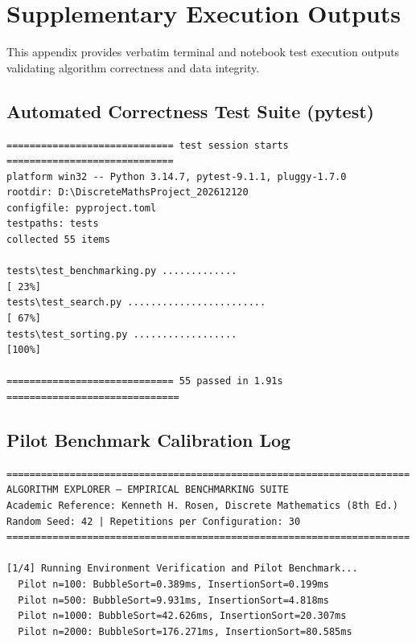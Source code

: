 \chapter{Supplementary Execution Outputs}
\label{app:outputs}

This appendix provides verbatim terminal and notebook test execution outputs validating algorithm correctness and data integrity.

\section{Automated Correctness Test Suite (pytest)}
\begin{verbatim}
============================= test session starts =============================
platform win32 -- Python 3.14.7, pytest-9.1.1, pluggy-1.7.0
rootdir: D:\DiscreteMathsProject_202612120
configfile: pyproject.toml
testpaths: tests
collected 55 items

tests\test_benchmarking.py .............                                 [ 23%]
tests\test_search.py ........................                            [ 67%]
tests\test_sorting.py ..................                                 [100%]

============================= 55 passed in 1.91s ==============================
\end{verbatim}

\section{Pilot Benchmark Calibration Log}
\begin{verbatim}
======================================================================
ALGORITHM EXPLORER — EMPIRICAL BENCHMARKING SUITE
Academic Reference: Kenneth H. Rosen, Discrete Mathematics (8th Ed.)
Random Seed: 42 | Repetitions per Configuration: 30
======================================================================

[1/4] Running Environment Verification and Pilot Benchmark...
  Pilot n=100: BubbleSort=0.389ms, InsertionSort=0.199ms
  Pilot n=500: BubbleSort=9.931ms, InsertionSort=4.818ms
  Pilot n=1000: BubbleSort=42.626ms, InsertionSort=20.307ms
  Pilot n=2000: BubbleSort=176.271ms, InsertionSort=80.585ms
\end{verbatim}
